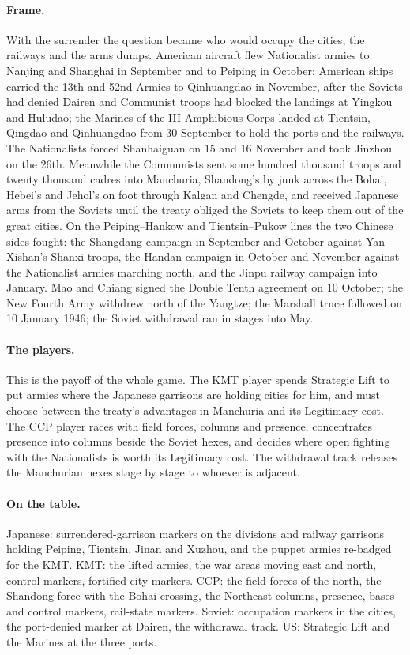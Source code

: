 \documentclass[11pt]{article}
\begin{document}
\paragraph{Frame.} With the surrender the question became who would occupy the cities, the railways and the arms dumps. American aircraft flew Nationalist armies to Nanjing and Shanghai in September and to Peiping in October; American ships carried the 13th and 52nd Armies to Qinhuangdao in November, after the Soviets had denied Dairen and Communist troops had blocked the landings at Yingkou and Huludao; the Marines of the III Amphibious Corps landed at Tientsin, Qingdao and Qinhuangdao from 30 September to hold the ports and the railways. The Nationalists forced Shanhaiguan on 15 and 16 November and took Jinzhou on the 26th. Meanwhile the Communists sent some hundred thousand troops and twenty thousand cadres into Manchuria, Shandong's by junk across the Bohai, Hebei's and Jehol's on foot through Kalgan and Chengde, and received Japanese arms from the Soviets until the treaty obliged the Soviets to keep them out of the great cities. On the Peiping--Hankow and Tientsin--Pukow lines the two Chinese sides fought: the Shangdang campaign in September and October against Yan Xishan's Shanxi troops, the Handan campaign in October and November against the Nationalist armies marching north, and the Jinpu railway campaign into January. Mao and Chiang signed the Double Tenth agreement on 10 October; the New Fourth Army withdrew north of the Yangtze; the Marshall truce followed on 10 January 1946; the Soviet withdrawal ran in stages into May.
\paragraph{The players.} This is the payoff of the whole game. The KMT player spends Strategic Lift to put armies where the Japanese garrisons are holding cities for him, and must choose between the treaty's advantages in Manchuria and its Legitimacy cost. The CCP player races with field forces, columns and presence, concentrates presence into columns beside the Soviet hexes, and decides where open fighting with the Nationalists is worth its Legitimacy cost. The withdrawal track releases the Manchurian hexes stage by stage to whoever is adjacent.
\paragraph{On the table.} Japanese: surrendered-garrison markers on the divisions and railway garrisons holding Peiping, Tientsin, Jinan and Xuzhou, and the puppet armies re-badged for the KMT. KMT: the lifted armies, the war areas moving east and north, control markers, fortified-city markers. CCP: the field forces of the north, the Shandong force with the Bohai crossing, the Northeast columns, presence, bases and control markers, rail-state markers. Soviet: occupation markers in the cities, the port-denied marker at Dairen, the withdrawal track. US: Strategic Lift and the Marines at the three ports.
\end{document}
